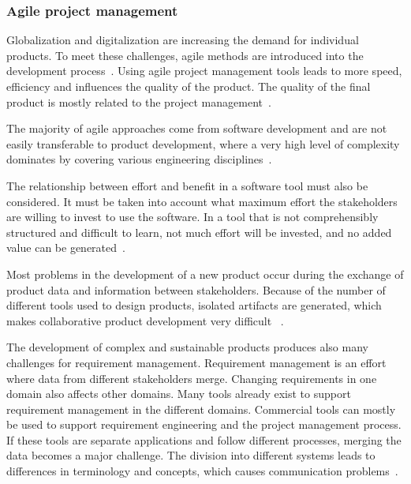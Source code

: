 
    \subsubsection*{Agile project management}
    Globalization and digitalization are increasing the demand for individual products. To meet these challenges, agile methods are introduced into the development process~\cite{HEIMICKE2021786}. 
    Using agile project management tools leads to more speed, efficiency and influences the quality of the product. The quality of the final product is mostly related to the project management~\cite{ozkan2019agile}. 





    The majority of agile approaches come from software development and are not easily transferable to product development, where a very high level of complexity dominates by covering various engineering disciplines~\cite{HEIMICKE2021786}.

    The relationship between effort and benefit in a software tool must also be considered. It must be taken into account what maximum effort the stakeholders are willing to invest to use the software. In a tool that is not comprehensibly structured and difficult to learn, not much effort will be invested, and no added value can be generated~\cite{RICHTER2020271}.



    Most problems in the development of a new product occur during the exchange of product data and information between stakeholders. Because of the number of different tools used to design products, isolated artifacts are generated, which makes collaborative product development very difficult ~\cite{houshmand2010collaborative}.

    The development of complex and sustainable products produces also many challenges for requirement management. Requirement management is an effort where data from different stakeholders merge. 
    Changing requirements in one domain also affects other domains. Many tools already exist to support requirement management in the different domains. Commercial tools can mostly be used to support requirement engineering and the project management process. If these tools are separate applications and follow different processes, merging the data becomes a major challenge. The division into different systems leads to differences in terminology and concepts, which causes communication problems~\cite{Jorma2014}.

